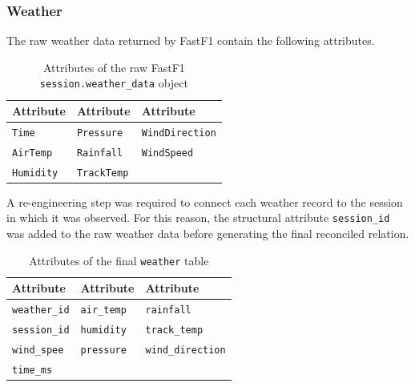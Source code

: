 \documentclass[12pt,a4paper]{article}
\begin{document}
	\subsubsection{Weather}
	
	The raw weather data returned by FastF1 contain the following attributes.
	
	\begin{table}[H]
		\centering
		\caption{Attributes of the raw FastF1 \texttt{session.weather\_data} object}
		\renewcommand{\arraystretch}{1.15}
		\begin{tabularx}{0.95\textwidth}{>{\raggedright\arraybackslash}X >{\raggedright\arraybackslash}X >{\raggedright\arraybackslash}X}
			\toprule
			\textbf{Attribute} & \textbf{Attribute} & \textbf{Attribute} \\
			\midrule
			\texttt{Time} & \texttt{Pressure} & \texttt{WindDirection} \\
			\texttt{AirTemp} & \texttt{Rainfall} & \texttt{WindSpeed} \\
			\texttt{Humidity} & \texttt{TrackTemp} & \\
			\bottomrule
		\end{tabularx}
	\end{table}
	
	A re-engineering step was required to connect each weather record to the session in which it was observed.
	For this reason, the structural attribute \texttt{session\_id} was added to the raw weather data before generating the final reconciled relation.
	
	\begin{table}[H]
		\centering
		\caption{Attributes of the final \texttt{weather} table}
		\renewcommand{\arraystretch}{1.15}
		\begin{tabularx}{0.95\textwidth}{>{\raggedright\arraybackslash}X >{\raggedright\arraybackslash}X >{\raggedright\arraybackslash}X}
			\toprule
			\textbf{Attribute} & \textbf{Attribute} & \textbf{Attribute} \\
			\midrule
			\texttt{weather\_id}   & \texttt{air\_temp}       & \texttt{rainfall} \\
			\texttt{session\_id}  & \texttt{humidity}        & \texttt{track\_temp} \\
			\texttt{wind\_spee  }  & \texttt{pressure}        & \texttt{wind\_direction} \\
			\texttt{time\_ms}       &     & \\
			\bottomrule
		\end{tabularx}
	\end{table}
	
\end{document}
